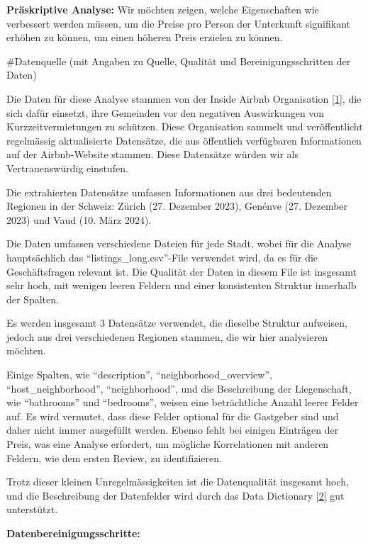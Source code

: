 \documentclass[
  journal,
]{IEEEtran}%
\begin{document}
\textbf{Präskriptive Analyse:} Wir möchten zeigen, welche Eigenschaften
wie verbessert werden müssen, um die Preise pro Person der Unterkunft
signifikant erhöhen zu können, um einen höheren Preis erzielen zu
können.

\#Datenquelle (mit Angaben zu Quelle, Qualität und Bereinigungsschritten
der Daten)

Die Daten für diese Analyse stammen von der Inside Airbnb Organisation
\protect\hyperlink{ref-inside-airbnb-2023}{{[}1{]}}, die sich dafür
einsetzt, ihre Gemeinden vor den negativen Auswirkungen von
Kurzzeitvermietungen zu schützen. Diese Organisation sammelt und
veröffentlicht regelmässig aktualisierte Datensätze, die aus öffentlich
verfügbaren Informationen auf der Airbnb-Website stammen. Diese
Datensätze würden wir als Vertrauenswürdig einstufen.

Die extrahierten Datensätze umfassen Informationen aus drei bedeutenden
Regionen in der Schweiz: Zürich (27. Dezember 2023), Genénve (27.
Dezember 2023) und Vaud (10. März 2024).

Die Daten umfassen verschiedene Dateien für jede Stadt, wobei für die
Analyse hauptsächlich das ``listings\_long.csv''-File verwendet wird, da
es für die Geschäftsfragen relevant ist. Die Qualität der Daten in
diesem File ist insgesamt sehr hoch, mit wenigen leeren Feldern und
einer konsistenten Struktur innerhalb der Spalten.

Es werden insgesamt 3 Datensätze verwendet, die dieselbe Struktur
aufweisen, jedoch aus drei verschiedenen Regionen stammen, die wir hier
analysieren möchten.

Einige Spalten, wie ``description'', ``neighborhood\_overview'',
``host\_neighborhood'', ``neighborhood'', und die Beschreibung der
Liegenschaft, wie ``bathrooms'' und ``bedrooms'', weisen eine
beträchtliche Anzahl leerer Felder auf. Es wird vermutet, dass diese
Felder optional für die Gastgeber sind und daher nicht immer ausgefüllt
werden. Ebenso fehlt bei einigen Einträgen der Preis, was eine Analyse
erfordert, um mögliche Korrelationen mit anderen Feldern, wie dem ersten
Review, zu identifizieren.

Trotz dieser kleinen Unregelmässigkeiten ist die Datenqualität insgesamt
hoch, und die Beschreibung der Datenfelder wird durch das Data
Dictionary \protect\hyperlink{ref-inside-airbnb-2022}{{[}2{]}} gut
unterstützt.

\textbf{Datenbereinigungsschritte:}
\end{document}
